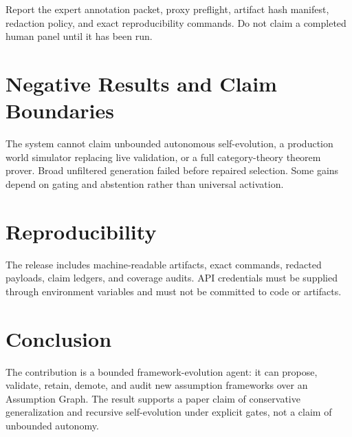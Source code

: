 \documentclass[11pt]{article}
\begin{document}
Report the expert annotation packet, proxy preflight, artifact hash manifest,
redaction policy, and exact reproducibility commands.  Do not claim a completed
human panel until it has been run.

\section{Negative Results and Claim Boundaries}

The system cannot claim unbounded autonomous self-evolution, a production world
simulator replacing live validation, or a full category-theory theorem prover.
Broad unfiltered generation failed before repaired selection.  Some gains depend
on gating and abstention rather than universal activation.

\section{Reproducibility}

The release includes machine-readable artifacts, exact commands, redacted
payloads, claim ledgers, and coverage audits.  API credentials must be supplied
through environment variables and must not be committed to code or artifacts.

\section{Conclusion}

The contribution is a bounded framework-evolution agent: it can propose,
validate, retain, demote, and audit new assumption frameworks over an Assumption
Graph.  The result supports a paper claim of conservative generalization and
recursive self-evolution under explicit gates, not a claim of unbounded autonomy.
\end{document}
